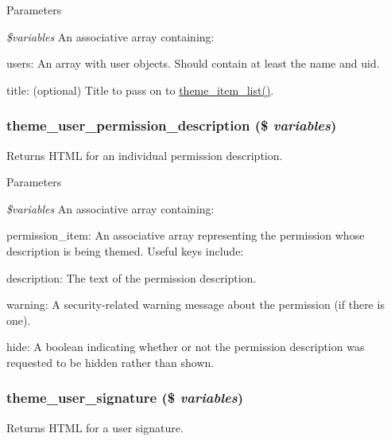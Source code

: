 \begin{DoxyParams}{Parameters}
\item[{\em \$variables}]An associative array containing:
\begin{DoxyItemize}
\item users: An array with user objects. Should contain at least the name and uid.
\item title: (optional) Title to pass on to \hyperlink{group__themeable_ga515afdc4832483a813cd09ba4786fdfe}{theme\_\-item\_\-list()}. 
\end{DoxyItemize}\end{DoxyParams}
\hypertarget{group__themeable_ga459815f84e50a6416f625577c99b9017}{
\subsubsection[{theme\_\-user\_\-permission\_\-description}]{\setlength{\rightskip}{0pt plus 5cm}theme\_\-user\_\-permission\_\-description (\$ {\em variables})}}
\label{group__themeable_ga459815f84e50a6416f625577c99b9017}
Returns HTML for an individual permission description.


\begin{DoxyParams}{Parameters}
\item[{\em \$variables}]An associative array containing:
\begin{DoxyItemize}
\item permission\_\-item: An associative array representing the permission whose description is being themed. Useful keys include:
\begin{DoxyItemize}
\item description: The text of the permission description.
\item warning: A security-\/related warning message about the permission (if there is one).
\end{DoxyItemize}
\item hide: A boolean indicating whether or not the permission description was requested to be hidden rather than shown. 
\end{DoxyItemize}\end{DoxyParams}
\hypertarget{group__themeable_gabbd05d2d793e3f9ab99fee965bc3bbc2}{
\subsubsection[{theme\_\-user\_\-signature}]{\setlength{\rightskip}{0pt plus 5cm}theme\_\-user\_\-signature (\$ {\em variables})}}
\label{group__themeable_gabbd05d2d793e3f9ab99fee965bc3bbc2}
Returns HTML for a user signature.



